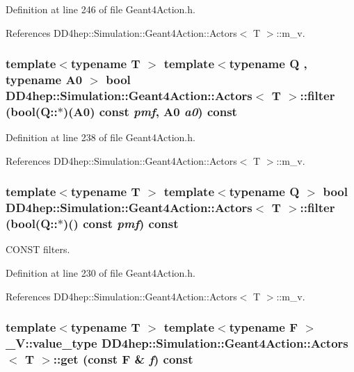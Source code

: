 Definition at line 246 of file Geant4Action.h.

References DD4hep::Simulation::Geant4Action::Actors$<$ T $>$::m\_\-v.\hypertarget{class_d_d4hep_1_1_simulation_1_1_geant4_action_1_1_actors_a964b1f489de666ec45209a4e9a580816}{
\subsubsection[{filter}]{\setlength{\rightskip}{0pt plus 5cm}template$<$typename T $>$ template$<$typename Q , typename A0 $>$ bool {\bf DD4hep::Simulation::Geant4Action::Actors}$<$ {\bf T} $>$::filter (bool(Q::$\ast$)(A0) const  {\em pmf}, \/  A0 {\em a0}) const}}
\label{class_d_d4hep_1_1_simulation_1_1_geant4_action_1_1_actors_a964b1f489de666ec45209a4e9a580816}


Definition at line 238 of file Geant4Action.h.

References DD4hep::Simulation::Geant4Action::Actors$<$ T $>$::m\_\-v.\hypertarget{class_d_d4hep_1_1_simulation_1_1_geant4_action_1_1_actors_ad1e31731b8d00aa040573008fccf95d1}{
\subsubsection[{filter}]{\setlength{\rightskip}{0pt plus 5cm}template$<$typename T $>$ template$<$typename Q $>$ bool {\bf DD4hep::Simulation::Geant4Action::Actors}$<$ {\bf T} $>$::filter (bool(Q::$\ast$)() const  {\em pmf}) const}}
\label{class_d_d4hep_1_1_simulation_1_1_geant4_action_1_1_actors_ad1e31731b8d00aa040573008fccf95d1}


CONST filters. 

Definition at line 230 of file Geant4Action.h.

References DD4hep::Simulation::Geant4Action::Actors$<$ T $>$::m\_\-v.\hypertarget{class_d_d4hep_1_1_simulation_1_1_geant4_action_1_1_actors_a1aa919d30933f36bdac3cc527f7ea5e5}{
\subsubsection[{get}]{\setlength{\rightskip}{0pt plus 5cm}template$<$typename T $>$ template$<$typename F $>$ \_\-V::value\_\-type {\bf DD4hep::Simulation::Geant4Action::Actors}$<$ {\bf T} $>$::get (const F \& {\em f}) const}}
\label{class_d_d4hep_1_1_simulation_1_1_geant4_action_1_1_actors_a1aa919d30933f36bdac3cc527f7ea5e5}


